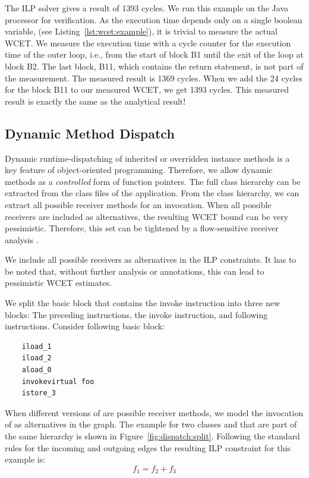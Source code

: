 The ILP solver  gives a result of 1393 cycles. We run
this example on the Java processor for verification. As the execution
time depends only on a single boolean variable,  (see
Listing~\ref{lst:wcet:example}), it is trivial to measure the actual
WCET. We measure the execution time with a cycle counter for the
execution time of the outer loop, i.e., from the start of block B1
until the exit of the loop at block B2. The last block, B11, which
contains the return statement, is not part of the measurement. The
measured result is 1369 cycles.  When we add the 24 cycles for the
block B11 to our measured WCET, we get 1393 cycles. This measured
result is exactly the same as the analytical result!

\subsection{Dynamic Method Dispatch}

Dynamic runtime-dispatching of inherited or overridden instance
methods is a key feature of object-oriented programming. Therefore,
we allow dynamic methods as a \emph{controlled} form of function
pointers. The full class hierarchy can be extracted from the class
files of the application. From the class hierarchy, we can extract
all possible receiver methods for an invocation. When all possible
receivers are included as alternatives, the resulting WCET bound can
be very pessimistic. Therefore, this set can be tightened by a
flow-sensitive receiver analysis \cite{dfa:puffitsch:2009}.

We include all possible receivers as alternatives in the ILP
constraints. It has to be noted that, without further analysis or
annotations, this can lead to pessimistic WCET estimates.

We split the basic block that contains the invoke instruction into
three new blocks: The preceding instructions, the invoke instruction,
and following instructions. Consider following basic block:

\begin{samepage}
\begin{lstlisting}
    iload_1
    iload_2
    aload_0
    invokevirtual foo
    istore_3
\end{lstlisting}
\end{samepage}

When different versions of  are possible receiver
methods, we model the invocation of  as alternatives in
the graph. The example for two classes  and  that are
part of the same hierarchy is shown in
Figure~\ref{fig:dispatch:split}. Following the standard rules for the
incoming and outgoing edges the resulting ILP constraint for this
example is:
\begin{equation*}
    f_1 = f_2 + f_3
\end{equation*}



